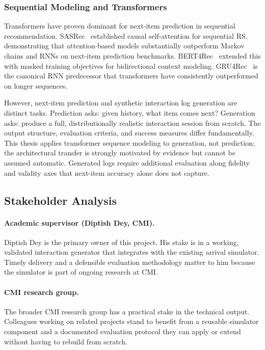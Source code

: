 \documentclass[sigconf,nonacm]{acmart}
\begin{document}
\subsubsection{Sequential Modeling and Transformers}
Transformers have proven dominant for next-item prediction in sequential
recommendation. SASRec~\cite{kang2018sasrec} established causal
self-attention for sequential RS, demonstrating that attention-based models
substantially outperform Markov chains and RNNs on next-item prediction
benchmarks. BERT4Rec~\cite{sun2019bert4rec} extended this with masked
training objectives for bidirectional context modeling.
GRU4Rec~\cite{hidasi2015gru4rec} is the canonical RNN predecessor that
transformers have consistently outperformed on longer sequences.

However, next-item prediction and synthetic interaction log generation are
distinct tasks. Prediction asks: given history, what item comes next?
Generation asks: produce a full, distributionally realistic interaction
session from scratch. The output structure, evaluation criteria, and success
measures differ fundamentally. This thesis applies transformer sequence
modeling to generation, not prediction; the architectural transfer is
strongly motivated by evidence but cannot be assumed automatic. Generated
logs require additional evaluation along fidelity and validity axes that
next-item accuracy alone does not capture.

\subsection{Stakeholder Analysis}
\label{sec:stakeholders}

\paragraph{Academic supervisor (Diptish Dey, CMI).}
Diptish Dey is the primary owner of this project. His stake is in a working,
validated interaction generator that integrates with the existing arrival
simulator. Timely delivery and a defensible evaluation methodology matter to
him because the simulator is part of ongoing research at CMI.

\paragraph{CMI research group.}
The broader CMI research group has a practical stake in the technical
output. Colleagues working on related projects stand to benefit from a
reusable simulator component and a documented evaluation protocol they can
apply or extend without having to rebuild from scratch.
\end{document}
